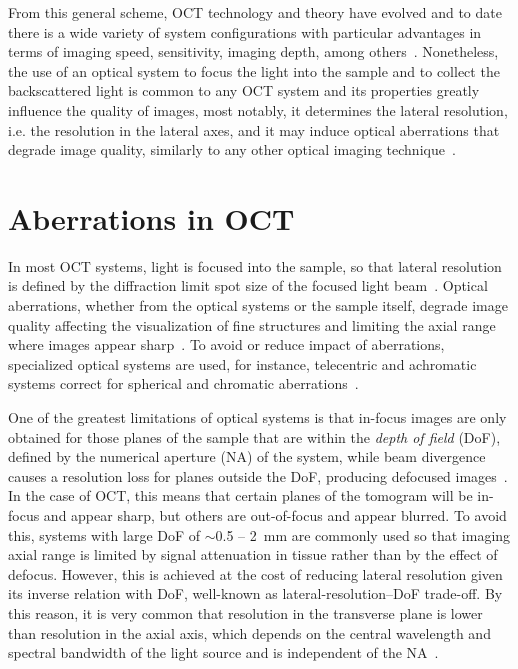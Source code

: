 From this general scheme, OCT technology and theory have evolved and to date there is a wide variety of system configurations with particular advantages in terms of imaging speed, sensitivity, imaging depth, among others~\cite{Fujimoto2015_Introduction}. Nonetheless, the use of an optical system to focus the light into the sample and to collect the backscattered light is common to any OCT system and its properties greatly influence the quality of images, most notably, it determines the lateral resolution, i.e. the resolution in the lateral axes, and it may induce optical aberrations that degrade image quality, similarly to any other optical imaging technique~\cite{Ralston2006_Interferometric, Yasuno2006_Noniterative, Adie2012_Computational}.

\section{Aberrations in OCT}

In most OCT systems, light is focused into the sample, so that lateral resolution is defined by the diffraction limit spot size of the focused light beam~\cite{Fujimoto2015_Introduction}. Optical aberrations, whether from the optical systems or the sample itself, degrade image quality affecting the visualization of fine structures and limiting the axial range where images appear sharp~\cite{Ralston2006_Interferometric,Zawadzki2005_Adaptiveoptics}. To avoid or reduce impact of aberrations, specialized optical systems are used, for instance, telecentric and achromatic systems correct for spherical and chromatic aberrations~\cite{Hu2015_Optical}.

One of the greatest limitations of optical systems is that in-focus images are only obtained for those planes of the sample that are within the \textit{depth of field} (DoF), defined by the numerical aperture (NA) of the system, while beam divergence causes a resolution loss for planes outside the DoF, producing defocused images~\cite{Yasuno2006_Noniterative, Ralston2006_Interferometric}. In the case of OCT, this means that certain planes of the tomogram will be in-focus and appear sharp, but others are out-of-focus and appear blurred. To avoid this, systems with large DoF of $\sim$0.5 -- 2~mm are commonly used so that imaging axial range is limited by signal attenuation in tissue rather than by the effect of defocus. However, this is achieved at the cost of reducing lateral resolution given its inverse relation with DoF, well-known as lateral-resolution--DoF trade-off. By this reason, it is very common that resolution in the transverse plane is lower than resolution in the axial axis, which depends on the central wavelength and spectral bandwidth of the light source and is independent of the NA~\cite{Fujimoto2015_Introduction}.

